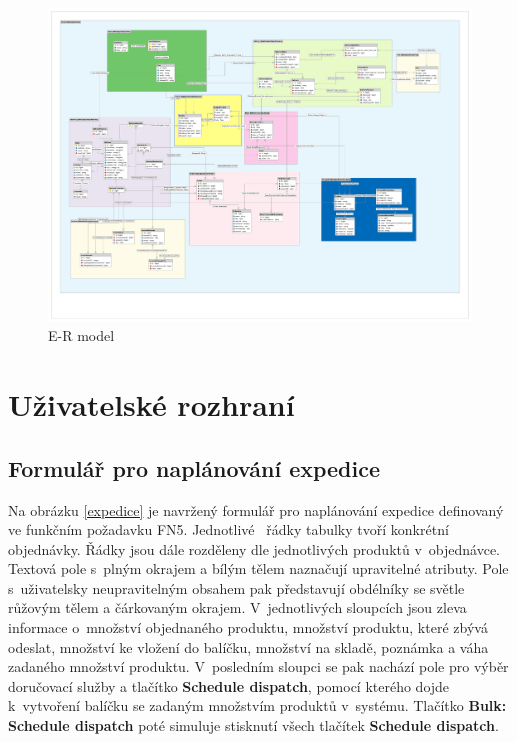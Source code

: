 \documentclass[thesis=B,czech]{FITthesis}[2012/06/26]
\begin{document}
\begin{figure}
	\includegraphics[width=500pt, height=\textwidth, angle=90]{mahasys_ermodel.pdf}
	\caption{E-R model}\label{er_model}
\end{figure}



\section{Uživatelské rozhraní}

\subsection{Formulář pro naplánování expedice}
	Na obrázku \ref{expedice} je navržený formulář pro naplánování expedice definovaný ve funkčním požadavku FN5. Jednotlivé ~řádky tabulky tvoří konkrétní objednávky. Řádky jsou dále rozděleny dle jednotlivých produktů v~objednávce. Textová pole s~plným okrajem a bílým tělem naznačují upravitelné atributy. Pole s~uživatelsky neupravitelným obsahem pak představují obdélníky se světle růžovým tělem a čárkovaným okrajem. V~jednotlivých sloupcích jsou zleva informace o~množství objednaného produktu, množství produktu, které zbývá odeslat, množství ke vložení do balíčku, množství na skladě, poznámka a váha zadaného množství produktu. V~posledním sloupci se pak nachází pole pro výběr doručovací služby a tlačítko \textbf{Schedule dispatch}, pomocí kterého dojde k~vytvoření balíčku se zadaným množstvím produktů v~systému. Tlačítko \textbf{Bulk: Schedule dispatch} poté simuluje stisknutí všech tlačítek \textbf{Schedule dispatch}.
\end{document}
